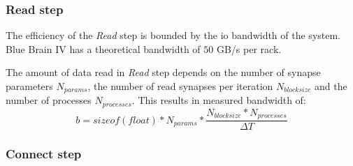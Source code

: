 \subsubsection{Read step}
The efficiency of the \emph{Read} step is bounded by the io bandwidth of the system.
Blue Brain IV has a theoretical bandwidth of $50$ GB/s per rack.

The amount of data read in \emph{Read} step depends on the number of synapse parameters $N_{params}$,
the number of read synapses per iteration $N_{blocksize}$ and the number of processes $N_{processes}$.
This results in measured bandwidth of:
\begin{equation}
b = sizeof(float) * N_{params} * \frac{N_{blocksize} * N_{processes}}{\Delta T}
\end{equation}
\subsubsection{Connect step}

